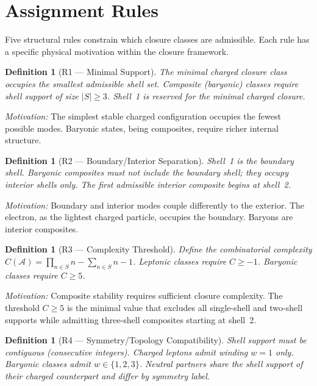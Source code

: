 \documentclass[12pt]{article}
\newtheorem{definition}[theorem]{Definition}
\newcommand{\Acal}{\mathcal{A}}
\begin{document}
\section{Assignment Rules}\label{sec:rules}

Five structural rules constrain which closure classes are admissible. Each rule has a specific physical motivation within the closure framework.

\begin{definition}[R1 --- Minimal Support]\label{def:R1}
The minimal charged closure class occupies the smallest admissible shell set. Composite (baryonic) classes require shell support of size $|S| \geq 3$. Shell~1 is reserved for the minimal charged closure.
\end{definition}

\textit{Motivation:} The simplest stable charged configuration occupies the fewest possible modes. Baryonic states, being composites, require richer internal structure.

\begin{definition}[R2 --- Boundary/Interior Separation]\label{def:R2}
Shell~1 is the boundary shell. Baryonic composites must not include the boundary shell; they occupy interior shells only. The first admissible interior composite begins at shell~2.
\end{definition}

\textit{Motivation:} Boundary and interior modes couple differently to the exterior. The electron, as the lightest charged particle, occupies the boundary. Baryons are interior composites.

\begin{definition}[R3 --- Complexity Threshold]\label{def:R3}
Define the combinatorial complexity $C(\Acal) = \prod_{n \in S} n - \sum_{n \in S} n - 1$. Leptonic classes require $C \geq -1$. Baryonic classes require $C \geq 5$.
\end{definition}

\textit{Motivation:} Composite stability requires sufficient closure complexity. The threshold $C \geq 5$ is the minimal value that excludes all single-shell and two-shell supports while admitting three-shell composites starting at shell~2.

\begin{definition}[R4 --- Symmetry/Topology Compatibility]\label{def:R4}
Shell support must be contiguous (consecutive integers). Charged leptons admit winding $w = 1$ only. Baryonic classes admit $w \in \{1, 2, 3\}$. Neutral partners share the shell support of their charged counterpart and differ by symmetry label.
\end{definition}
\end{document}
